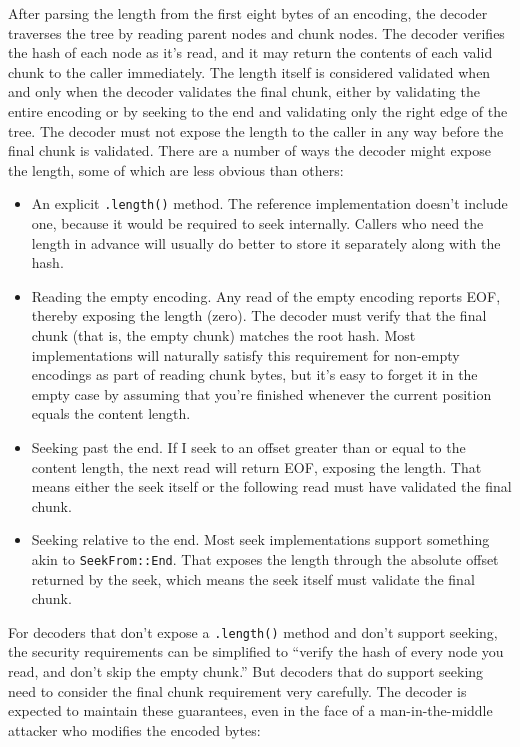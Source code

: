 \documentclass[11pt,notitlepage,a4paper]{article}
\begin{document}
After parsing the length from the first eight bytes of an encoding, the decoder traverses the tree by reading parent nodes and chunk nodes. The decoder verifies the hash of each node as it's read, and it may return the contents of each valid chunk to the caller immediately. The length itself is considered validated when and only when the decoder validates the final chunk, either by validating the entire encoding or by seeking to the end and validating only the right edge of the tree. The decoder must not expose the length to the caller in any way before the final chunk is validated. There are a number of ways the decoder might expose the length, some of which are less obvious than others:
\begin{itemize}
\item An explicit \texttt{.length()} method. The reference implementation doesn't include one, because it would be required to seek internally. Callers who need the length in advance will usually do better to store it separately along with the hash.
\item Reading the empty encoding. Any read of the empty encoding reports EOF, thereby exposing the length (zero). The decoder must verify that the final chunk (that is, the empty chunk) matches the root hash. Most implementations will naturally satisfy this requirement for non-empty encodings as part of reading chunk bytes, but it's easy to forget it in the empty case by assuming that you're finished whenever the current position equals the content length.
\item Seeking past the end. If I seek to an offset greater than or equal to the content length, the next read will return EOF, exposing the length. That means either the seek itself or the following read must have validated the final chunk.
\item Seeking relative to the end. Most seek implementations support something akin to \texttt{SeekFrom::End}. That exposes the length through the absolute offset returned by the seek, which means the seek itself must validate the final chunk.
\end{itemize}
For decoders that don't expose a \texttt{.length()} method and don't support seeking, the security requirements can be simplified to ``verify the hash of every node you read, and don't skip the empty chunk.'' But decoders that do support seeking need to consider the final chunk requirement very carefully. The decoder is expected to maintain these guarantees, even in the face of a man-in-the-middle attacker who modifies the encoded bytes:
\end{document}
